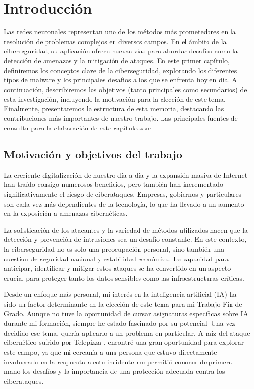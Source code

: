 \chapter{Introducción} \label{Capitulo 1}
Las redes neuronales representan uno de los métodos más prometedores en la resolución de problemas complejos en diversos campos. En el ámbito de la ciberseguridad, su aplicación ofrece nuevas vías para abordar desafíos como la detección de amenazas y la mitigación de ataques. En este primer capítulo, definiremos los conceptos clave de la ciberseguridad, explorando los diferentes tipos de malware y los principales desafíos a los que se enfrenta hoy en día. A continuación, describiremos los objetivos (tanto principales como secundarios) de esta investigación, incluyendo la motivación para la elección de este tema. Finalmente, presentaremos la estructura de esta memoria, destacando las contribuciones más importantes de nuestro trabajo. Las principales fuentes de consulta para la elaboración de este capítulo son: \citep{podder2021artificial, geron2022hands, pajares2021aprendizaje}.


\section{Motivación y objetivos del trabajo} \label{Sec:1_1}

La creciente digitalización de nuestro día a día y la expansión masiva de Internet han traído consigo numerosos beneficios, pero también han incrementado significativamente el riesgo de ciberataques. Empresas, gobiernos y particulares son cada vez más dependientes de la tecnología, lo que ha llevado a un aumento en la exposición a amenazas cibernéticas.

La sofisticación de los atacantes y la variedad de métodos utilizados hacen que la detección y prevención de intrusiones sea un desafío constante. En este contexto, la ciberseguridad no es solo una preocupación personal, sino también una cuestión de seguridad nacional y estabilidad económica. La capacidad para anticipar, identificar y mitigar estos ataques se ha convertido en un aspecto crucial para proteger tanto los datos sensibles como las infraestructuras críticas.

Desde un enfoque más personal, mi interés en la inteligencia artificial (IA) ha sido un factor determinante en la elección de este tema para mi Trabajo Fin de Grado. Aunque no tuve la oportunidad de cursar asignaturas específicas sobre IA durante mi formación, siempre he estado fascinado por su potencial. Una vez decidido ese tema, quería aplicarlo a un problema en particular. A raíz del ataque cibernético sufrido por Telepizza \citep{telepizza}, encontré una gran oportunidad para explorar este campo, ya que mi cercanía a una persona que estuvo directamente involucrado en la respuesta a este incidente me permitió conocer de primera mano los desafíos y la importancia de una protección adecuada contra los ciberataques.


